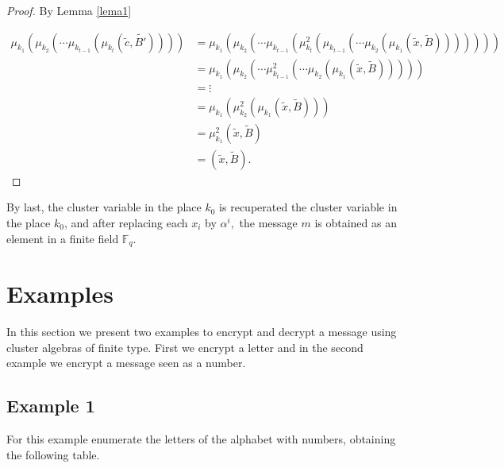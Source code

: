 \documentclass[12pt,a4paper]{article}
\begin{document}
\begin{proof}
By Lemma \ref{lema1}

\begin{equation*}
\begin{array}{rl}
\mu_{k_{1}}(\mu_{k_{2}}(\cdots \mu_{k_{t-1}}(\mu_{k_t}(\tilde{c},\tilde{B'})))) & = \mu_{k_{1}}(\mu_{k_{2}}(\cdots \mu_{k_{t-1}}(\mu^2_{k_t}(\mu_{k_{t-1}}(\cdots \mu_{k_2}(\mu_{k_1}(\tilde{x},\tilde{B}))))))) \\
& = \mu_{k_{1}}(\mu_{k_{2}}(\cdots \mu^2_{k_{t-1}}(\cdots \mu_{k_2}(\mu_{k_1}(\tilde{x},\tilde{B}))))) \\
& = \vdots \\
& = \mu_{k_{1}}(\mu^2_{k_{2}}(\mu_{k_1}(\tilde{x},\tilde{B}))) \\
& = \mu^2_{k_{1}}(\tilde{x},\tilde{B}) \\
& = (\tilde{x},\tilde{B}).
\end{array}
\end{equation*}

\end{proof}

By last, the cluster variable in the place $k_0$ is recuperated the cluster variable in the place $k_0$, and after replacing each $x_i$ by $\alpha^i,$ the message $m$ is obtained  as an element in a finite field $\mathbb{F}_q$.

\section{Examples}

In this section we present two examples to encrypt and decrypt a message using cluster algebras of finite type. First we encrypt a letter and in the second example we encrypt a message seen as a number.



\subsection*{Example 1}

For this example enumerate the letters of the alphabet with numbers, obtaining the following table.
\end{document}
